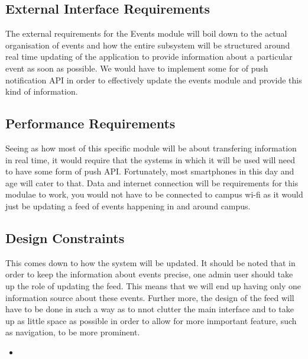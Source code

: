 \documentclass{article}
\begin{document}
			\subsection{External Interface Requirements}
					The external requirements for the Events module will boil down to the actual organisation of events and how the entire subsystem will be structured around real time updating of the application to provide information about a particular event as soon as possible. We would have to implement some for of push notification API in order to effectively update the events module and provide this kind of information.

			\subsection{Performance Requirements}
					Seeing as how most of this specific module will be about transfering information in real time, it would require that the systems in which it will be used will need to have some form of push API. Fortunately, most smartphones in this day and age will cater to that. Data and internet connection will be requirements for this modulae to work, you would not have to be connected to campus wi-fi as it would just be updating a feed of events happening in and around campus.

			\subsection{Design Constraints}
					This comes down to how the system will be updated. It should be noted that in order to keep the information about events precise, one admin user should take up the role of updating the feed. This means that we will end up having only one information source about these events. Further more, the design of the feed will have to be done in such a way as to nnot clutter the main interface and to take up as little space as possible in order to allow for more inmportant feature, such as navigation, to be more prominent.
			\begin{itemize}
				\item				
			\end{itemize}
\end{document}
